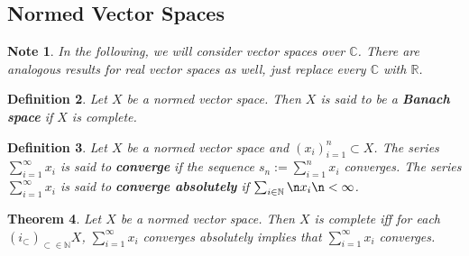 \documentclass[12pt]{amsart}
\newtheorem{thm}{Theorem}[subsection]
\newtheorem{defn}[thm]{Definition}
\newtheorem{note}[thm]{Note}
\newcommand{\C}{\mathbb{C}}
\newcommand{\N}{\mathbb{N}}
\newcommand{\R}{\mathbb{R}}
\newcommand{\seq}[2]{(#1_{#2})_{#2 \in \N}}
\begin{document}
\subsection{Normed Vector Spaces}
\begin{note}
	In the following, we will consider vector spaces over $\C$. There are analogous results for real vector spaces as well, just replace every $\C$ with $\R$.
\end{note}

\begin{defn}
	Let $X$ be a normed vector space. Then $X$ is said to be a \textbf{Banach space} if $X$ is complete.  
\end{defn}

\begin{defn}
	Let $X$ be a normed vector space and $(x_i)_{i=1}^n \subset X$. The series $\sum_{i =1}^{\infty}x_i$ is said to \textbf{converge} if the sequence $s_n := \sum_{i=1}^n x_i$ converges. The series $\sum_{i =1}^{\infty}x_i$ is said to \textbf{converge absolutely} if $\sum_{i\in \N}\n x_i \n < \infty$.
\end{defn}

\begin{thm}
	Let $X$ be a normed vector space. Then $X$ is complete iff for each $\seq{i} \subset X$, $\sum_{i =1}^{\infty}x_i$ converges absolutely implies that $\sum_{i=1}^{\infty}x_i$ converges. 
\end{thm}
\end{document}
